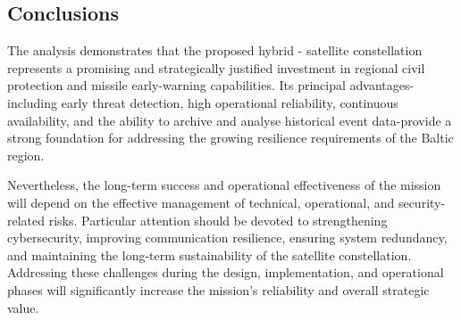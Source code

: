 \subsection{Conclusions}

The  analysis demonstrates that the proposed hybrid - satellite constellation represents a promising and strategically justified investment in regional civil protection and missile early-warning capabilities. Its principal advantages-including early threat detection, high operational reliability, continuous availability, and the ability to archive and analyse historical event data-provide a strong foundation for addressing the growing resilience requirements of the Baltic region.

Nevertheless, the long-term success and operational effectiveness of the  mission will depend on the effective management of technical, operational, and security-related risks. Particular attention should be devoted to strengthening cybersecurity, improving communication resilience, ensuring system redundancy, and maintaining the long-term sustainability of the satellite constellation. Addressing these challenges during the design, implementation, and operational phases will significantly increase the mission's reliability and overall strategic value.